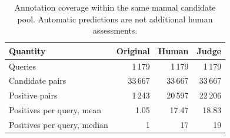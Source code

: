 \begin{table}[t]
\caption{Annotation coverage within the same manual candidate pool. Automatic predictions are not additional human assessments.}
\label{tab:annotation-data}
\centering\small
\begin{tabularx}{\textwidth}{@{}Lrrr@{}}
\toprule
Quantity & Original & Human & Judge \\
\midrule
Queries & 1\,179 & 1\,179 & 1\,179 \\
Candidate pairs & 33\,667 & 33\,667 & 33\,667 \\
Positive pairs & 1\,243 & 20\,597 & 22\,206 \\
Positives per query, mean & 1.05 & 17.47 & 18.83 \\
Positives per query, median & 1 & 17 & 19 \\
\bottomrule
\end{tabularx}
\end{table}
